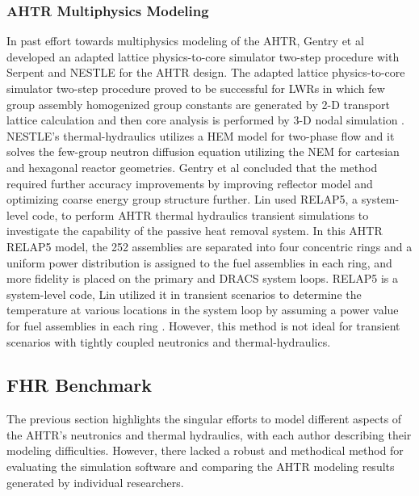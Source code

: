 \subsubsection{AHTR Multiphysics Modeling}
In past effort towards multiphysics modeling of the \gls{AHTR}, Gentry et al 
\cite{gentry_development_2016} developed an adapted lattice physics-to-core 
simulator two-step procedure with Serpent \cite{leppanen_serpent_2014} 
and \gls{NESTLE} \cite{turinsky_nestle_1994} for the \gls{AHTR} design. 
The adapted lattice physics-to-core simulator two-step procedure proved to be 
successful for \glspl{LWR} in which few group assembly homogenized group 
constants are generated by 2-D transport lattice calculation and then core 
analysis is performed by 3-D nodal simulation 
\cite{koebke_new_1980,gentry_development_2016}.
\gls{NESTLE}'s thermal-hydraulics utilizes a \gls{HEM} model for two-phase 
flow and it solves the few-group neutron diffusion equation utilizing the
\gls{NEM} for cartesian and hexagonal reactor geometries.  
Gentry et al concluded that the method required further accuracy improvements 
by improving reflector model and optimizing coarse energy group structure further.
Lin \cite{lin_thermal_2020} used RELAP5, a system-level code, to perform 
\gls{AHTR} thermal hydraulics transient simulations to investigate the 
capability of the passive heat removal system. 
In this \gls{AHTR} RELAP5 model, the 252 assemblies are separated into four 
concentric rings and a uniform power distribution is assigned to the fuel 
assemblies in each ring, and more fidelity is placed on the primary and 
\gls{DRACS} system loops. 
RELAP5 is a system-level code, Lin utilized it in transient scenarios to determine 
the temperature at various locations in the system loop by assuming a power 
value for fuel assemblies in each ring \cite{lin_thermal_2020}. 
However, this method is not ideal for transient scenarios with tightly coupled 
neutronics and thermal-hydraulics. 

\subsection{FHR Benchmark}
The previous section highlights the singular efforts to model 
different aspects of the \gls{AHTR}'s neutronics and thermal hydraulics, with
each author describing their modeling difficulties. 
However, there lacked a robust and methodical method for evaluating the 
simulation software and comparing the \gls{AHTR} modeling results generated by 
individual researchers.

